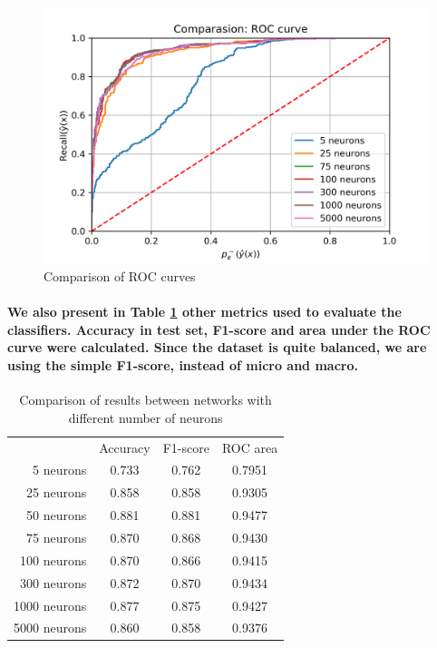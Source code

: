 \documentclass[a4paper]{article}    %
\begin{document}
\begin{figure}[H]
    \centering
    \includegraphics[width=12cm]{ROC_comparasion}
    \caption{Comparison of ROC curves}
    \label{fig:mlp-roc_comparasion}
\end{figure}

\paragraph{We also present in Table \ref{tab:results} other metrics used to evaluate the classifiers. Accuracy in test set, F1-score and area under the ROC curve were calculated. Since the dataset is quite balanced, we are using the simple F1-score, instead of micro and macro.}

\begin{table}[H]
    \begin{center}
        \begin{tabular}{ r|c|c|c|} 
            \cline{2-4}
              & Accuracy & F1-score & ROC area \\
            \cline{2-4}
               5 neurons & 0.733 & 0.762 & 0.7951 \\
              25 neurons & 0.858 & 0.858 & 0.9305 \\
              50 neurons & 0.881 & 0.881 & 0.9477 \\
              75 neurons & 0.870 & 0.868 & 0.9430 \\ 
             100 neurons & 0.870 & 0.866 & 0.9415 \\
             300 neurons & 0.872 & 0.870 & 0.9434 \\
            1000 neurons & 0.877 & 0.875 & 0.9427 \\
            5000 neurons & 0.860 & 0.858 & 0.9376 \\
            \cline{2-4}
        \end{tabular}
    \end{center}
    \caption{Comparison of results between networks with different number of neurons}
    \label{tab:results}
\end{table}
\end{document}
